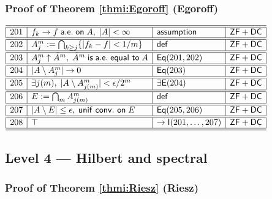 \documentclass[11pt,reqno]{amsart}
\begin{document}
\medskip

\subsubsection*{Proof of Theorem \ref{thmi:Egoroff} (\textsf{Egoroff})}

\noindent$%
\begin{array}{|r|l|l|l|}
\hline\hline
201 & f_{k}\to f\;\mathsf{a.e.}\;\mathsf{on}\;A,\;|A|<\infty & \mathsf{assumption} & \mathsf{ZF+DC} \\ \hline\hline
202 & A_{j}^{m}:=\bigcap_{k\ge j}\{|f_{k}-f|<1/m\} & \mathsf{def} & \mathsf{ZF+DC} \\ \hline\hline
203 & A_{j}^{m}\uparrow\tilde{A}^{m},\;\tilde{A}^{m}\;\mathsf{is}\;\mathsf{a.e.}\;\mathsf{equal\ to}\;A & \mathsf{Eq}(201,202) & \mathsf{ZF+DC} \\ \hline\hline
204 & |A\setminus A_{j}^{m}|\to0 & \mathsf{Eq}(203) & \mathsf{ZF+DC} \\ \hline\hline
205 & \exists j(m),\;|A\setminus A_{j(m)}^{m}|<\epsilon/2^{m} & \exists\mathsf{E}(204) & \mathsf{ZF+DC} \\ \hline\hline
206 & E:=\bigcap_{m}A_{j(m)}^{m} & \mathsf{def} & \mathsf{ZF+DC} \\ \hline\hline
207 & |A\setminus E|\le\epsilon,\;\mathsf{unif\ conv.\ on}\;E & \mathsf{Eq}(205,206) & \mathsf{ZF+DC} \\ \hline\hline
208 & \top & \to\mathsf{I}(201,\dots,207) & \mathsf{ZF+DC} \\ \hline\hline
\end{array}%
$

\medskip

\subsection*{\textsf{Level 4 --- Hilbert and spectral}}

\subsubsection*{Proof of Theorem \ref{thmi:Riesz} (\textsf{Riesz})}
\end{document}
